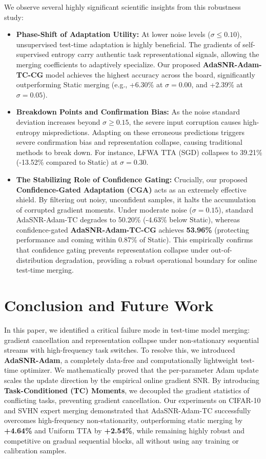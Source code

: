 \documentclass{article}
\theoremstyle{plain}
\theoremstyle{definition}
\theoremstyle{remark}
\begin{document}
We observe several highly significant scientific insights from this robustness study:
\begin{itemize}
    \item \textbf{Phase-Shift of Adaptation Utility:} At lower noise levels ($\sigma \le 0.10$), unsupervised test-time adaptation is highly beneficial. The gradients of self-supervised entropy carry authentic task representational signals, allowing the merging coefficients to adaptively specialize. Our proposed \textbf{AdaSNR-Adam-TC-CG} model achieves the highest accuracy across the board, significantly outperforming Static merging (e.g., +6.30\% at $\sigma = 0.00$, and +2.39\% at $\sigma = 0.05$).
    \item \textbf{Breakdown Points and Confirmation Bias:} As the noise standard deviation increases beyond $\sigma \ge 0.15$, the severe input corruption causes high-entropy mispredictions. Adapting on these erroneous predictions triggers severe confirmation bias and representation collapse, causing traditional methods to break down. For instance, LFWA TTA (SGD) collapses to 39.21\% (-13.52\% compared to Static) at $\sigma=0.30$.
    \item \textbf{The Stabilizing Role of Confidence Gating:} Crucially, our proposed \textbf{Confidence-Gated Adaptation (CGA)} acts as an extremely effective shield. By filtering out noisy, unconfident samples, it halts the accumulation of corrupted gradient moments. Under moderate noise ($\sigma = 0.15$), standard AdaSNR-Adam-TC degrades to 50.20\% (-4.63\% below Static), whereas confidence-gated \textbf{AdaSNR-Adam-TC-CG} achieves \textbf{53.96\%} (protecting performance and coming within 0.87\% of Static). This empirically confirms that confidence gating prevents representation collapse under out-of-distribution degradation, providing a robust operational boundary for online test-time merging.
\end{itemize}

\section{Conclusion and Future Work}
\label{sec:conclusion}
In this paper, we identified a critical failure mode in test-time model merging: gradient cancellation and representation collapse under non-stationary sequential streams with high-frequency task switches. To resolve this, we introduced \textbf{AdaSNR-Adam}, a completely data-free and computationally lightweight test-time optimizer. We mathematically proved that the per-parameter Adam update scales the update direction by the empirical online gradient SNR. By introducing \textbf{Task-Conditioned (TC) Moments}, we decoupled the gradient statistics of conflicting tasks, preventing gradient cancellation. Our experiments on CIFAR-10 and SVHN expert merging demonstrated that AdaSNR-Adam-TC successfully overcomes high-frequency non-stationarity, outperforming static merging by \textbf{+4.64\%} and Uniform TTA by \textbf{+2.54\%}, while remaining highly robust and competitive on gradual sequential blocks, all without using any training or calibration samples.
\end{document}

